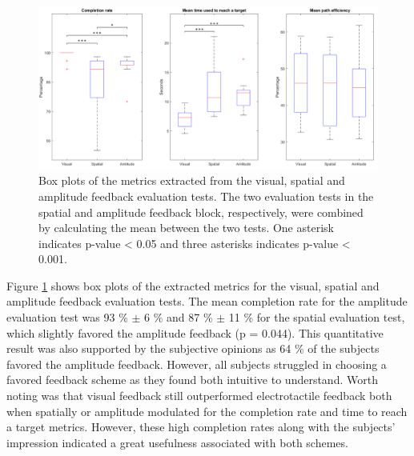 \begin{figure}[h]                 
	\includegraphics[width=1\textwidth]{figures/boxplot_results}
	\caption{Box plots of the metrics extracted from the visual, spatial and amplitude feedback evaluation tests. The two evaluation tests in the spatial and amplitude feedback block, respectively, were combined by calculating the mean between the two tests. One asterisk indicates p-value < 0.05 and three asterisks indicates p-value < 0.001.}
	\label{fig:pa:boxplot_results} 
\end{figure}
Figure \ref{fig:pa:boxplot_results} shows box plots of the extracted metrics for the visual, spatial and amplitude feedback evaluation tests. The mean completion rate for the amplitude evaluation test was 93 \% $\pm$ 6 \% and 87 \% $\pm$ 11 \% for the spatial evaluation test, which slightly favored the amplitude feedback (p = 0.044). This quantitative result was also supported by the subjective opinions as 64 \% of the subjects favored the amplitude feedback. However, all subjects struggled in choosing a favored feedback scheme as they found both intuitive to understand. Worth noting was that visual feedback still outperformed electrotactile feedback both when spatially or amplitude modulated for the completion rate and time to reach a target metrics. However, these high completion rates along with the subjects' impression indicated a great usefulness associated with both schemes.  
